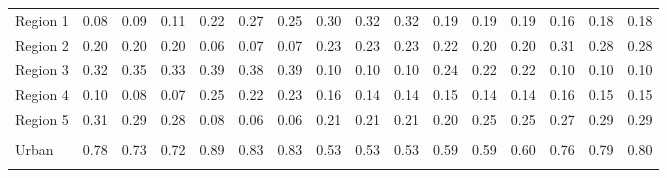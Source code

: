 \begin{tabular}{l*{15}{c}}
\\
Region 1 & 0.08 & 0.09 & 0.11 & 0.22 & 0.27 & 0.25 & 0.30 & 0.32 & 0.32 & 0.19 & 0.19 & 0.19 & 0.16 & 0.18 & 0.18 \\
Region 2 & 0.20 & 0.20 & 0.20 & 0.06 & 0.07 & 0.07 & 0.23 & 0.23 & 0.23 & 0.22 & 0.20 & 0.20 & 0.31 & 0.28 & 0.28 \\
Region 3 & 0.32 & 0.35 & 0.33 & 0.39 & 0.38 & 0.39 & 0.10 & 0.10 & 0.10 & 0.24 & 0.22 & 0.22 & 0.10 & 0.10 & 0.10 \\
Region 4 & 0.10 & 0.08 & 0.07 & 0.25 & 0.22 & 0.23 & 0.16 & 0.14 & 0.14 & 0.15 & 0.14 & 0.14 & 0.16 & 0.15 & 0.15  \\
Region 5 & 0.31 & 0.29 & 0.28 & 0.08 & 0.06 & 0.06 & 0.21 & 0.21 & 0.21 & 0.20 & 0.25 & 0.25 & 0.27 & 0.29 & 0.29 \\
\\
Urban & 0.78 & 0.73 & 0.72 & 0.89 & 0.83 & 0.83 & 0.53 & 0.53 & 0.53 & 0.59 & 0.59 & 0.60 & 0.76 & 0.79 & 0.80 \\
\\
\bottomrule
\end{tabular}